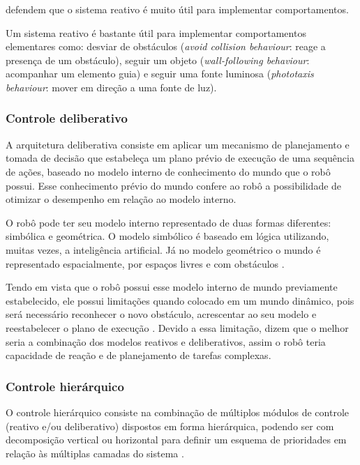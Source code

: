 	\cite{wolf2009robotica} defendem que o sistema reativo é muito útil para implementar comportamentos.
\begin{citacao}
Um sistema reativo é bastante útil para implementar comportamentos elementares como: desviar de obstáculos (\textit{avoid collision behaviour}: reage a presença de um obstáculo), seguir um objeto (\textit{wall-following behaviour}: acompanhar um elemento guia) e seguir uma fonte luminosa (\textit{phototaxis behaviour}: mover em direção a uma fonte de luz). 
\end{citacao}

\subsubsection{Controle deliberativo}
A arquitetura deliberativa consiste em aplicar um mecanismo de planejamento e tomada de decisão que estabeleça um plano prévio de execução de uma sequência de ações, baseado no modelo interno de conhecimento do mundo que o robô possui. Esse conhecimento prévio do mundo confere ao robô a possibilidade de otimizar o desempenho em relação ao modelo interno. 

O robô pode ter seu modelo interno representado de duas formas diferentes: simbólica e geométrica. O modelo simbólico é baseado em lógica utilizando, muitas vezes, a inteligência artificial. Já no modelo geométrico o mundo é representado espacialmente, por espaços livres e com obstáculos \cite{industriais2009sistema}.

Tendo em vista que o robô possui esse modelo interno de mundo previamente estabelecido, ele possui limitações quando colocado em um mundo dinâmico, pois será necessário reconhecer o novo obstáculo, acrescentar ao seu modelo e reestabelecer o plano de execução \cite{industriais2009sistema}. Devido a essa limitação, \cite{wolf2009robotica} dizem que o melhor seria a combinação dos modelos reativos e deliberativos, assim o robô teria capacidade de reação e de planejamento de tarefas complexas. 

\subsubsection{Controle hierárquico}
O controle hierárquico consiste na combinação de múltiplos módulos de controle (reativo e/ou deliberativo) dispostos em forma hierárquica, podendo ser com decomposição vertical ou horizontal para definir um esquema de prioridades em relação às múltiplas camadas do sistema \cite{wolf2009robotica}.

